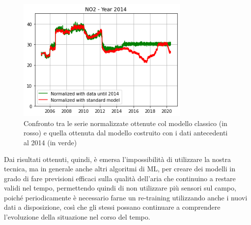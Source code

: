 \begin{figure}[h]
\centering
\includegraphics[width=0.75\textwidth]{no2_mantova_2014}
\caption{Confronto tra le serie normalizzate ottenute col modello classico (in rosso) e quella ottenuta dal modello costruito con i dati antecedenti al 2014 (in verde)}
\label{fig:no2_mantova_2014}
\end{figure}

Dai risultati ottenuti, quindi, è emersa l'impossibilità di utilizzare la nostra tecnica, ma in generale anche altri algoritmi di ML, per creare dei modelli in grado di fare previsioni efficaci sulla qualità dell'aria che continuino a restare validi nel tempo, permettendo quindi di non utilizzare più sensori sul campo, poiché periodicamente è necessario farne un re-training utilizzando anche i nuovi dati a disposizione, così che gli stessi possano continuare a comprendere l'evoluzione della situazione nel corso del tempo.  

